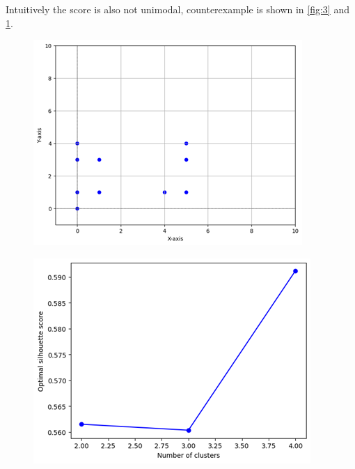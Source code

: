 \documentclass{article}
\begin{document}
Intuitively the score is also not unimodal, counterexample is shown in \ref{fig:3} and \ref{fig:4}.

\begin{figure}[htbp]
    \centering
    \begin{minipage}{0.45\linewidth}
        \centering
        \includegraphics[width=\linewidth]{ex2.png}
        \label{fig:3}
    \end{minipage}
    \hfill  %
    \begin{minipage}{0.45\linewidth}
        \centering
        \includegraphics[width=\linewidth]{plot2.png}
        \label{fig:4}
    \end{minipage}
\end{figure}
\end{document}
